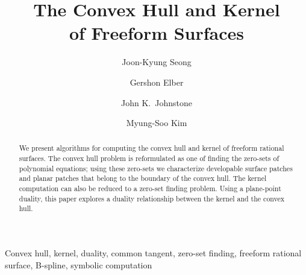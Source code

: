\documentclass{elsart}
\begin{document}
\begin{frontmatter}



\title{The Convex Hull and Kernel\\ of Freeform Surfaces}


\author[a]{Joon-Kyung Seong}
\author[b]{Gershon Elber}
\author[c]{John K.~Johnstone}
\author[a]{Myung-Soo Kim}

\address[a]{Seoul National University, Korea}
\address[b]{Technion -- Israel Institute of Technology, Israel}
\address[c]{University of Alabama at Birmingham, USA}

\begin{abstract}

\noindent 
We present algorithms for computing the convex hull and kernel of
freeform rational surfaces.  The convex hull problem is reformulated
as one of finding the zero-sets of polynomial equations;
using these zero-sets
we characterize developable surface patches and planar patches
that belong to the boundary of the convex hull.
The kernel computation can also be reduced to a zero-set finding problem.
Using a plane-point duality, this paper explores a 
duality relationship between the kernel and the convex hull.

\end{abstract}

\begin{keyword}
Convex hull, kernel, duality, common tangent, zero-set finding,
freeform rational surface, B-spline, symbolic computation
\end{keyword}

\end{frontmatter}

\end{document}
